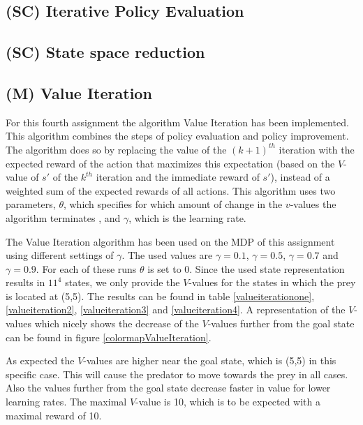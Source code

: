\documentclass{article}
\begin{document}
\subsection{(SC) Iterative Policy Evaluation}

\subsection{(SC) State space reduction}

\subsection{(M) Value Iteration}
For this fourth assignment the algorithm Value Iteration has been implemented. This algorithm combines the steps of policy evaluation and policy improvement. The algorithm does so by replacing the value of the $(k+1)^{th}$ iteration with the expected reward of the action that maximizes this expectation (based on the $V$-value of $s' $ of the $k^{th}$ iteration and the immediate reward of $s' $), instead of a weighted sum of the expected rewards of all actions. This algorithm uses two parameters, $\theta$, which specifies for which amount of change in the $v$-values the algorithm terminates , and $\gamma$, which is the learning rate.

The Value Iteration algorithm has been used on the MDP of this assignment using different settings of $\gamma$. The used values are $\gamma = 0.1$, $\gamma = 0.5$, $\gamma = 0.7$ and $\gamma = 0.9$. For each of these runs $\theta$ is set to 0. Since the used state representation results in $11^4$ states, we only provide the $V$-values for the states in which the prey is located at (5,5). The results can be found in table \ref{valueiterationone}, \ref{valueiteration2}, \ref{valueiteration3} and \ref{valueiteration4}. A representation of the $V$-values which nicely shows the decrease of the $V$-values further from the goal state can be found in figure \ref{colormapValueIteration}.

As expected the $V$-values are higher near the goal state, which is (5,5) in this specific case. This will cause the predator to move towards the prey in all cases. Also the values further from the goal state decrease faster in value for lower learning rates. The maximal $V$-value is 10, which is to be expected with a maximal reward of 10.
\end{document}

